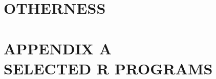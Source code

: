 \documentclass{BGSU}
\numberwithin{equation}{chapter}
\begin{document}
\chapter{\texorpdfstring{OTHERNESS}{}}


\backmatter







\mbox{}\newpage
{}
\appendix
\chapter{\texorpdfstring{APPENDIX A \\ SELECTED R PROGRAMS}{APPENDIX A}}

\end{document}
